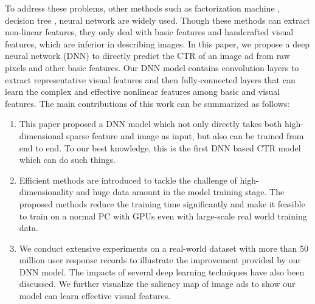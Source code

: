 \documentclass{sig-alternate-05-2015}
\begin{document}
To address these problems, other methods such as factorization machine \cite{rendle2010factorization}, decision tree \cite{he2014practical}, neural network \cite{zhang2016deep} are widely used. Though these methods can extract non-linear features, they only deal with basic features and handcrafted visual features, which are inferior in describing images. In this paper, we propose a deep neural network (DNN) to directly predict the CTR of an image ad from raw pixels and other basic features. Our DNN model contains convolution layers to extract representative visual features and then fully-connected layers that can learn the complex and effective nonlinear features among basic and visual features. The main contributions of this work can be summarized as follows:
\begin{enumerate}
	\item This paper proposed a DNN model which not only directly takes both high-dimensional sparse feature and image as input, but also can be trained from end to end. To our best knowledge, this is the first DNN based CTR model which can do such things.
	\item Efficient methods are introduced to tackle the challenge of  high-dimensionality and huge data amount in the model training stage. The proposed methods reduce the training time significantly and make it feasible to train on a normal PC with GPUs even with large-scale real world training data.
	\item We conduct extensive experiments on a real-world dataset with more than 50 million user response records to illustrate the improvement provided by our DNN model.  The impacts of several deep learning techniques have also been discussed.  We further visualize the saliency map of image ads to show our model can learn effective visual features.
\end{enumerate}
\end{document}
